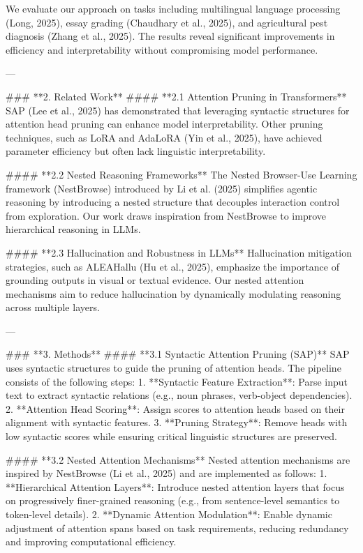 We evaluate our approach on tasks including multilingual language processing (Long, 2025), essay grading (Chaudhary et al., 2025), and agricultural pest diagnosis (Zhang et al., 2025). The results reveal significant improvements in efficiency and interpretability without compromising model performance.  

---

### **2. Related Work**  
#### **2.1 Attention Pruning in Transformers**  
SAP (Lee et al., 2025) has demonstrated that leveraging syntactic structures for attention head pruning can enhance model interpretability. Other pruning techniques, such as LoRA and AdaLoRA (Yin et al., 2025), have achieved parameter efficiency but often lack linguistic interpretability.  

#### **2.2 Nested Reasoning Frameworks**  
The Nested Browser-Use Learning framework (NestBrowse) introduced by Li et al. (2025) simplifies agentic reasoning by introducing a nested structure that decouples interaction control from exploration. Our work draws inspiration from NestBrowse to improve hierarchical reasoning in LLMs.  

#### **2.3 Hallucination and Robustness in LLMs**  
Hallucination mitigation strategies, such as ALEAHallu (Hu et al., 2025), emphasize the importance of grounding outputs in visual or textual evidence. Our nested attention mechanisms aim to reduce hallucination by dynamically modulating reasoning across multiple layers.  

---

### **3. Methods**  
#### **3.1 Syntactic Attention Pruning (SAP)**  
SAP uses syntactic structures to guide the pruning of attention heads. The pipeline consists of the following steps:  
1. **Syntactic Feature Extraction**: Parse input text to extract syntactic relations (e.g., noun phrases, verb-object dependencies).  
2. **Attention Head Scoring**: Assign scores to attention heads based on their alignment with syntactic features.  
3. **Pruning Strategy**: Remove heads with low syntactic scores while ensuring critical linguistic structures are preserved.  

#### **3.2 Nested Attention Mechanisms**  
Nested attention mechanisms are inspired by NestBrowse (Li et al., 2025) and are implemented as follows:  
1. **Hierarchical Attention Layers**: Introduce nested attention layers that focus on progressively finer-grained reasoning (e.g., from sentence-level semantics to token-level details).  
2. **Dynamic Attention Modulation**: Enable dynamic adjustment of attention spans based on task requirements, reducing redundancy and improving computational efficiency.  

